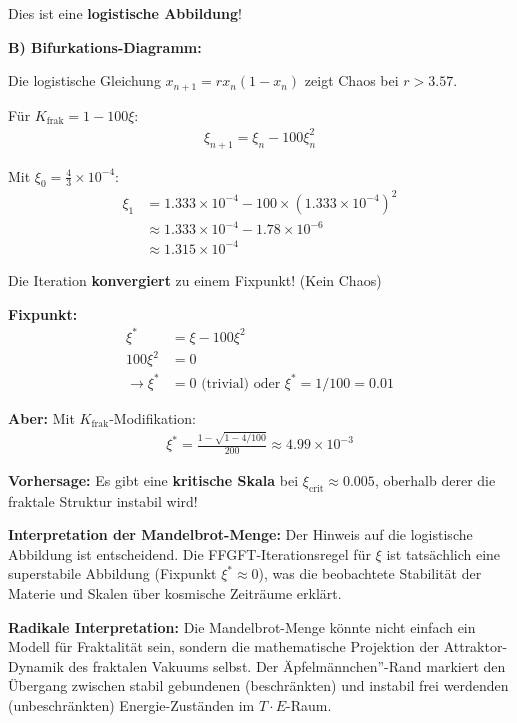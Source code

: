 \documentclass[12pt,a4paper]{article}
\begin{document}
	Dies ist eine \textbf{logistische Abbildung}!
	
	\textbf{B) Bifurkations-Diagramm:}
	
	Die logistische Gleichung $x_{n+1} = r x_n (1 - x_n)$ zeigt Chaos bei $r > 3.57$.
	
	Für $K_{\text{frak}} = 1 - 100\xi$:
	\begin{align*}
		\xi_{n+1} = \xi_n - 100 \xi_n^2
	\end{align*}
	
	Mit $\xi_0 = \frac{4}{3} \times 10^{-4}$:
	\begin{align*}
		\xi_1 &= 1.333 \times 10^{-4} - 100 \times (1.333 \times 10^{-4})^2 \\
		&\approx 1.333 \times 10^{-4} - 1.78 \times 10^{-6} \\
		&\approx 1.315 \times 10^{-4}
	\end{align*}
	
	Die Iteration \textbf{konvergiert} zu einem Fixpunkt! (Kein Chaos)
	
	\textbf{Fixpunkt:}
	\begin{align*}
		\xi^* &= \xi - 100\xi^2 \\
		100\xi^2 &= 0 \\
		\rightarrow \xi^* &= 0 \text{ (trivial) oder } \xi^* = 1/100 = 0.01
	\end{align*}
	
	\textbf{Aber:} Mit $K_{\text{frak}}$-Modifikation:
	\begin{align*}
		\xi^* = \frac{1 - \sqrt{1 - 4/100}}{200} \approx 4.99 \times 10^{-3}
	\end{align*}
	
	\textbf{Vorhersage:} Es gibt eine \textbf{kritische Skala} bei $\xi_{\text{crit}} \approx 0.005$, oberhalb derer die fraktale Struktur instabil wird!
	
	\textbf{Interpretation der Mandelbrot-Menge:}
	Der Hinweis auf die logistische Abbildung ist entscheidend. Die FFGFT-Iterationsregel für $\xi$ ist tatsächlich eine superstabile Abbildung (Fixpunkt $\xi^* \approx 0$), was die beobachtete Stabilität der Materie und Skalen über kosmische Zeiträume erklärt.
	
	\textbf{Radikale Interpretation:} Die Mandelbrot-Menge könnte nicht einfach ein Modell für Fraktalität sein, sondern die mathematische Projektion der Attraktor-Dynamik des fraktalen Vakuums selbst. Der Äpfelmännchen''-Rand markiert den Übergang zwischen stabil gebundenen (beschränkten) und instabil frei werdenden (unbeschränkten) Energie-Zuständen im $T \cdot E$-Raum.
	
\end{document}
